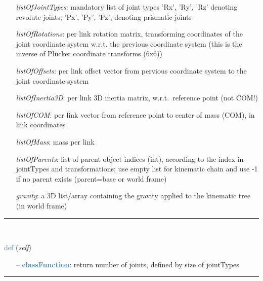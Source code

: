 \begin{itemize}[leftmargin=1.4cm]
\begin{itemize}[leftmargin=0.5cm]
\begin{itemize}[leftmargin=1.4cm]
\begin{itemize}[leftmargin=1.4cm]
\begin{itemize}[leftmargin=0.5cm]
\begin{itemize}[leftmargin=1.4cm]
\begin{itemize}[leftmargin=0.5cm]
\begin{itemize}[leftmargin=1.4cm]
\begin{itemize}[leftmargin=1.4cm]
\begin{itemize}[leftmargin=1.4cm]
\begin{itemize}[leftmargin=0.7cm]
  \begin{itemize}[leftmargin=1.2cm]
\setlength{\itemindent}{-0.7cm}
    \item[] {\it listOfJointTypes}: mandatory list of joint types 'Rx', 'Ry', 'Rz' denoting revolute joints; 'Px', 'Py', 'Pz', denoting prismatic joints
    \item[] {\it   listOfRotations}: per link rotation matrix, transforming coordinates of the joint coordinate system w.r.t. the previous coordinate system (this is the inverse of Pl\"ucker coordinate transforms (6x6))
    \item[] {\it   listOfOffsets}: per link offset vector from pervious coordinate system to the joint coordinate system
    \item[] {\it   listOfInertia3D}: per link 3D inertia matrix, w.r.t.\ reference point (not COM!)
    \item[] {\it   listOfCOM}: per link vector from reference point to center of mass (COM), in link coordinates
    \item[] {\it   listOfMass}: mass per link
    \item[] {\it   listOfParents}: list of parent object indices (int), according to the index in jointTypes and transformations; use empty list for kinematic chain and use -1 if no parent exists (parent=base or world frame)
    \item[] {\it   gravity}: a 3D list/array containing the gravity applied to the kinematic tree (in world frame)
  \end{itemize}
\vspace{12pt}\end{itemize}
%
\noindent\rule{8cm}{0.75pt}\vspace{1pt} \\ 
\begin{flushleft}
\noindent \textcolor{steelblue}{def {\bf {}}}\label{sec:kinematicTree:KinematicTree:Size}
({\it self})
\end{flushleft}
\setlength{\itemindent}{0.7cm}
\begin{itemize}[leftmargin=0.7cm]
  \item[--]  \textcolor{steelblue}{\bf classFunction}: return number of joints, defined by size of jointTypes\vspace{12pt}\end{itemize}
%
\noindent\rule{8cm}{0.75pt}\vspace{1pt} \\ 

\end{itemize}
\end{itemize}
\end{itemize}
\end{itemize}
\end{itemize}
\end{itemize}
\end{itemize}
\end{itemize}
\end{itemize}
\end{itemize}
